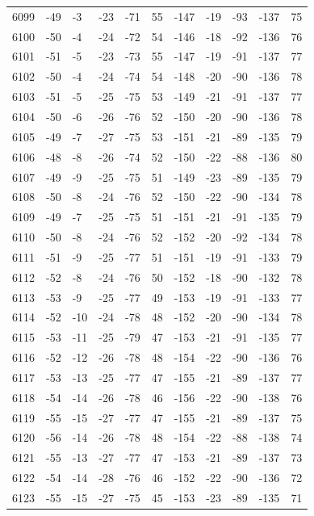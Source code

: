 \begin{table}[H]
\begin{tabular}{lllllllllll}
6099 & -49 & -3 & -23 & -71 & 55 & -147 & -19 & -93 & -137 & 75 \\
6100 & -50 & -4 & -24 & -72 & 54 & -146 & -18 & -92 & -136 & 76 \\
6101 & -51 & -5 & -23 & -73 & 55 & -147 & -19 & -91 & -137 & 77 \\
6102 & -50 & -4 & -24 & -74 & 54 & -148 & -20 & -90 & -136 & 78 \\
6103 & -51 & -5 & -25 & -75 & 53 & -149 & -21 & -91 & -137 & 77 \\
6104 & -50 & -6 & -26 & -76 & 52 & -150 & -20 & -90 & -136 & 78 \\
6105 & -49 & -7 & -27 & -75 & 53 & -151 & -21 & -89 & -135 & 79 \\
6106 & -48 & -8 & -26 & -74 & 52 & -150 & -22 & -88 & -136 & 80 \\
6107 & -49 & -9 & -25 & -75 & 51 & -149 & -23 & -89 & -135 & 79 \\
6108 & -50 & -8 & -24 & -76 & 52 & -150 & -22 & -90 & -134 & 78 \\
6109 & -49 & -7 & -25 & -75 & 51 & -151 & -21 & -91 & -135 & 79 \\
6110 & -50 & -8 & -24 & -76 & 52 & -152 & -20 & -92 & -134 & 78 \\
6111 & -51 & -9 & -25 & -77 & 51 & -151 & -19 & -91 & -133 & 79 \\
6112 & -52 & -8 & -24 & -76 & 50 & -152 & -18 & -90 & -132 & 78 \\
6113 & -53 & -9 & -25 & -77 & 49 & -153 & -19 & -91 & -133 & 77 \\
6114 & -52 & -10 & -24 & -78 & 48 & -152 & -20 & -90 & -134 & 78 \\
6115 & -53 & -11 & -25 & -79 & 47 & -153 & -21 & -91 & -135 & 77 \\
6116 & -52 & -12 & -26 & -78 & 48 & -154 & -22 & -90 & -136 & 76 \\
6117 & -53 & -13 & -25 & -77 & 47 & -155 & -21 & -89 & -137 & 77 \\
6118 & -54 & -14 & -26 & -78 & 46 & -156 & -22 & -90 & -138 & 76 \\
6119 & -55 & -15 & -27 & -77 & 47 & -155 & -21 & -89 & -137 & 75 \\
6120 & -56 & -14 & -26 & -78 & 48 & -154 & -22 & -88 & -138 & 74 \\
6121 & -55 & -13 & -27 & -77 & 47 & -153 & -21 & -89 & -137 & 73 \\
6122 & -54 & -14 & -28 & -76 & 46 & -152 & -22 & -90 & -136 & 72 \\
6123 & -55 & -15 & -27 & -75 & 45 & -153 & -23 & -89 & -135 & 71 \\

\end{tabular}
\end{table}
